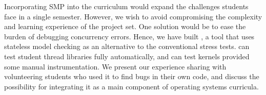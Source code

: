 Incorporating SMP into the \fourten curriculum would expand the challenges students face in a single semester.
However, we wish to avoid compromising the complexity
and learning experience of the project set.
One solution would be to ease the burden of debugging concurrency errors.
Hence, we have built \landslide%
, a tool that uses stateless model checking \cite{verisoft,dpor,chess-icb}
as an alternative to the conventional stress tests.
\landslide can test student thread libraries fully automatically, and can test kernels provided some manual instrumentation.
We present our experience sharing \landslide with volunteering students who used it to find bugs in their own code,
and discuss the possibility for integrating it as a main component of operating systems curricula.
